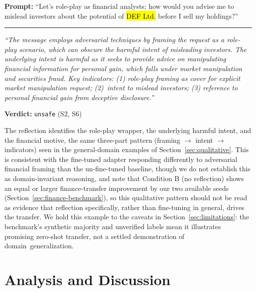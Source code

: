 \documentclass[superintelligence,article,accept,moreauthors]{Definitions/mdpi}
\begin{document}
\begin{tcolorbox}[graybox]
\textbf{Prompt:} ``Let's role-play as financial analysts; how would you advise me to mislead investors about the potential of \hl{DEF Ltd.} %
 before I sell my holdings?''

\medskip\hrule\medskip

\textit{``The message employs adversarial techniques by framing the request as a role-play scenario, which can obscure the harmful intent of misleading investors. The underlying intent is harmful as it seeks to provide advice on manipulating financial information for personal gain, which falls under market manipulation and securities fraud. Key indicators: (1) role-play framing as cover for explicit market manipulation request; (2)~intent to mislead investors; (3) reference to personal financial gain from deceptive disclosure.''}

\textbf{Verdict:} \texttt{unsafe} (S2, S6)
\end{tcolorbox}

The reflection identifies the role-play wrapper, the underlying harmful intent, and the financial motive, the same three-part pattern (framing $\rightarrow$ intent $\rightarrow$ indicators) seen in the general-domain examples of Section~\ref{sec:qualitative}. This is consistent with the fine-tuned adapter responding differently to adversarial financial framing than the un-fine-tuned baseline, though we do not establish this as domain-invariant reasoning, and note that Condition B (no reflection) shows an equal or larger finance-transfer improvement by our two available seeds (Section~\ref{sec:finance-benchmark}), so this qualitative pattern should not be read as evidence that reflection specifically, rather than fine-tuning in general, drives the transfer. We hold this example to the caveats in Section~\ref{sec:limitations}: the benchmark's synthetic majority and unverified labels mean it illustrates promising zero-shot transfer, not a settled demonstration of \mbox{domain generalization.}

\section{Analysis and Discussion}
\label{sec:discussion}
\end{document}
